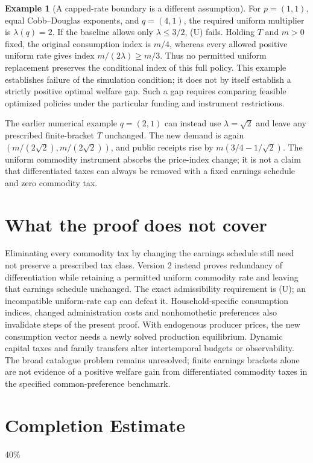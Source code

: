 \documentclass[11pt]{article}
\theoremstyle{definition}
\newtheorem{example}{Example}
\begin{document}
\begin{example}[A capped-rate boundary is a different assumption]
For $p=(1,1)$, equal Cobb--Douglas exponents, and $q=(4,1)$, the
required uniform multiplier is $\lambda(q)=2$. If the baseline allows
only $\lambda\leq3/2$, (U) fails. Holding $T$ and $m>0$ fixed, the
original consumption index is $m/4$, whereas every allowed positive
uniform rate gives index $m/(2\lambda)\geq m/3$. Thus no permitted
uniform replacement preserves the conditional index of this full
policy. This example establishes failure of the simulation condition;
it does not by itself establish a strictly positive optimal welfare
gap. Such a gap requires comparing feasible optimized policies under
the particular funding and instrument restrictions.
\end{example}

The earlier numerical example $q=(2,1)$ can instead use
$\lambda=\sqrt2$ and leave any prescribed finite-bracket $T$ unchanged.
The new demand is again $(m/(2\sqrt2),m/(2\sqrt2))$, and public receipts
rise by $m(3/4-1/\sqrt2)$. The uniform commodity instrument absorbs the
price-index change; it is not a claim that differentiated taxes can
always be removed with a fixed earnings schedule and zero commodity tax.

\section*{What the proof does not cover}
Eliminating every commodity tax by changing the earnings schedule still need not preserve a prescribed tax class. Version 2 instead proves redundancy of differentiation while retaining a permitted uniform commodity rate and leaving that earnings schedule unchanged. The exact admissibility requirement is (U); an incompatible uniform-rate cap can defeat it. Household-specific consumption indices, changed administration costs and nonhomothetic preferences also invalidate steps of the present proof. With endogenous producer prices, the new consumption vector needs a newly solved production equilibrium. Dynamic capital taxes and family transfers alter intertemporal budgets or observability. The broad catalogue problem remains unresolved; finite earnings brackets alone are not evidence of a positive welfare gain from differentiated commodity taxes in the specified common-preference benchmark.
\section{Completion Estimate}
40\%
\end{document}
